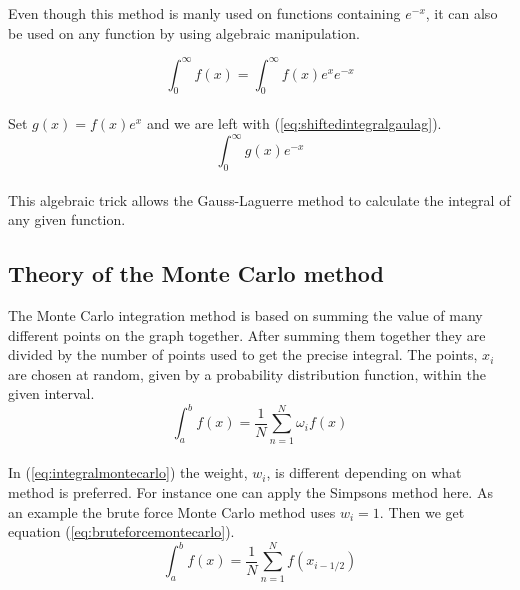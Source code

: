 \documentclass{article}
\begin{document}
Even though this method is manly used on functions containing $e^{-x}$, it can also be used on any function by using algebraic manipulation.

\begin{equation}
    \int_{0}^{\infty} f(x) = \int_{0}^{\infty} f(x) e^{x} e^{-x}
\end{equation} \\

Set $g(x) = f(x) e^x$ and we are left with (\ref{eq:shiftedintegralgaulag}).  \\

\begin{equation} \label{eq:shiftedintegralgaulag}
    \int_{0}^{\infty} g(x) e^{-x}
\end{equation} \\

This algebraic trick allows the Gauss-Laguerre method to calculate the integral of any given function. \\

\subsection{Theory of the Monte Carlo method}

The Monte Carlo integration method is based on summing the value of many different points on the graph together. After summing them together they are divided by the number of points used to get the precise integral. The points, $x_i$ are chosen at random, given by a probability distribution function, within the given interval. \\

\begin{equation} \label{eq:integralmontecarlo}
    \int_{a}^{b} f(x) = \frac{1}{N} \sum_{n=1}^{N} \omega_if(x)
\end{equation} \\

In (\ref{eq:integralmontecarlo}) the weight, $w_i$, is different depending on what method is preferred. For instance one can apply the Simpsons method here. As an example the brute force Monte Carlo method uses $w_i = 1$. Then we get equation (\ref{eq:bruteforcemontecarlo}). \\

\begin{equation} \label{eq:bruteforcemontecarlo}
    \int_{a}^{b} f(x) = \frac{1}{N} \sum_{n=1}^{N} f(x_{i-1/2})
\end{equation} \\
\end{document}
